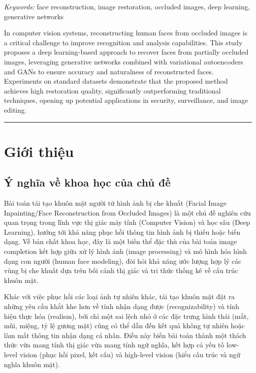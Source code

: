 \documentclass[12pt,a4paper]{article}
\begin{document}
	\begin{multicols}{2}
		\noindent
		\textit{Keywords:} face reconstruction, image restoration, occluded images, deep learning, generative networks
		
		\columnbreak
		
		In computer vision systems, reconstructing human faces from occluded images is a critical challenge to improve recognition and analysis capabilities. This study proposes a deep learning-based approach to recover faces from partially occluded images, leveraging generative networks combined with variational autoencoders and GANs to ensure accuracy and naturalness of reconstructed faces. Experiments on standard datasets demonstrate that the proposed method achieves high restoration quality, significantly outperforming traditional techniques, opening up potential applications in security, surveillance, and image editing.
	\end{multicols}
	
	\vspace{-0.4em}
	\noindent\rule{\textwidth}{0.6pt}
	
	
	\section{Giới thiệu}
	\subsection{Ý nghĩa về khoa học của chủ đề}
	Bài toán tái tạo khuôn mặt người từ hình ảnh bị che khuất (Facial Image Inpainting/Face Reconstruction from Occluded Images) là một chủ đề nghiên cứu quan trọng trong lĩnh vực thị giác máy tính (Computer Vision) và học sâu (Deep Learning), hướng tới khả năng phục hồi thông tin hình ảnh bị thiếu hoặc biến dạng. Về bản chất khoa học, đây là một biến thể đặc thù của bài toán image completion kết hợp giữa xử lý hình ảnh (image processing) và mô hình hóa hình dạng con người (human face modeling), đòi hỏi khả năng ước lượng hợp lý các vùng bị che khuất dựa trên bối cảnh thị giác và tri thức thống kê về cấu trúc khuôn mặt.
	
	Khác với việc phục hồi các loại ảnh tự nhiên khác, tái tạo khuôn mặt đặt ra những yêu cầu khắt khe hơn về tính nhận dạng được (recognizability) và tính hiện thực hóa (realism), bởi chỉ một sai lệch nhỏ ở các đặc trưng hình thái (mắt, mũi, miệng, tỷ lệ gương mặt) cũng có thể dẫn đến kết quả không tự nhiên hoặc làm mất thông tin nhận dạng cá nhân. Điều này biến bài toán thành một thách thức vừa mang tính thị giác vừa mang tính ngữ nghĩa, kết hợp cả yếu tố low-level vision (phục hồi pixel, kết cấu) và high-level vision (hiểu cấu trúc và ngữ nghĩa khuôn mặt).
	
\end{document}
